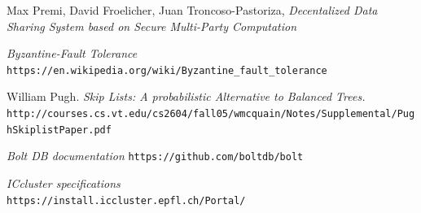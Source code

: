 \documentclass{article}
\begin{document}
\begin{thebibliography}{9}
Max Premi, David Froelicher, Juan Troncoso-Pastoriza, \textit{Decentalized Data Sharing System based on Secure Multi-Party Computation}

\textit{Byzantine-Fault Tolerance}\\
\texttt{https://en.wikipedia.org/wiki/Byzantine\_fault\_tolerance}

William Pugh. \textit{Skip Lists: A probabilistic Alternative to Balanced Trees.}\\
\texttt{http://courses.cs.vt.edu/cs2604/fall05/wmcquain/Notes/Supplemental/PughSkiplistPaper.pdf}


\textit{Bolt DB documentation}
\texttt{https://github.com/boltdb/bolt}

\textit{ICcluster specifications}\\
\texttt{https://install.iccluster.epfl.ch/Portal/}

\end{thebibliography}
\end{document}
